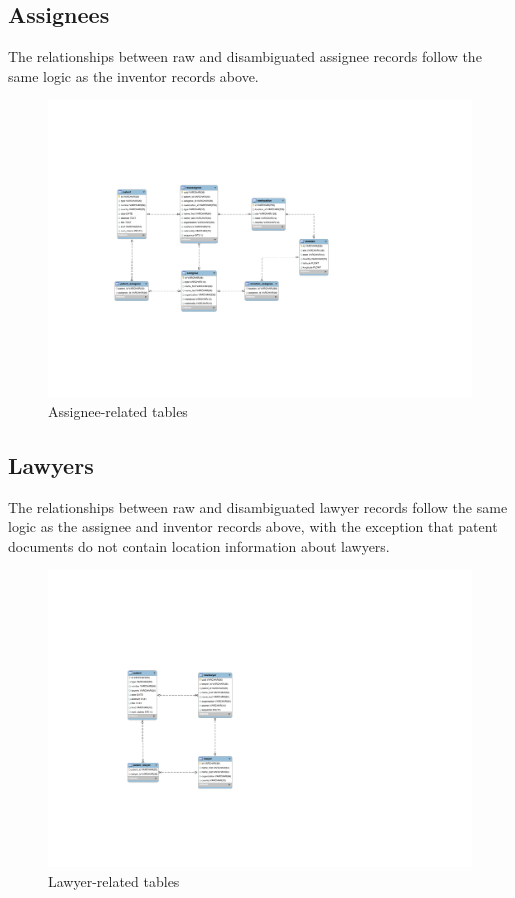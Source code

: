 \subsection*{Assignees}

The relationships between raw and disambiguated assignee records follow the same logic as the inventor records above.

\begin{figure}[!htbp]
\includegraphics[width=\linewidth]{figs/Assignee}
\caption{Assignee-related tables}
\end{figure}

\subsection*{Lawyers}

The relationships between raw and disambiguated lawyer records follow the same logic as the assignee and inventor records above, with the exception
that patent documents do not contain location information about lawyers.

\begin{figure}[!htbp]
\includegraphics[width=.3\linewidth]{figs/Lawyer}
\caption{Lawyer-related tables}
\end{figure}
